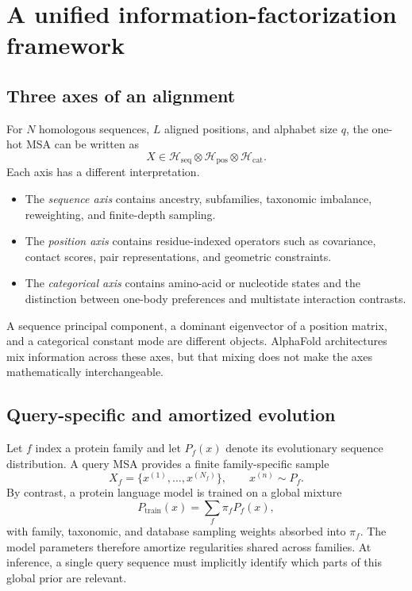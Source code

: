 \documentclass[10pt]{article}
\begin{document}
\section{A unified information-factorization framework}

\subsection{Three axes of an alignment}

For $N$ homologous sequences, $L$ aligned positions, and alphabet size $q$, the one-hot MSA can be
written as
\begin{equation}
X\in
\mathcal H_{\mathrm{seq}}
\otimes
\mathcal H_{\mathrm{pos}}
\otimes
\mathcal H_{\mathrm{cat}}.
\label{eq:msa-product-space}
\end{equation}
Each axis has a different interpretation.
\begin{itemize}
\setlength{\itemsep}{1pt}
\item The \emph{sequence axis} contains ancestry, subfamilies, taxonomic imbalance, reweighting,
and finite-depth sampling.
\item The \emph{position axis} contains residue-indexed operators such as covariance, contact
scores, pair representations, and geometric constraints.
\item The \emph{categorical axis} contains amino-acid or nucleotide states and the distinction
between one-body preferences and multistate interaction contrasts.
\end{itemize}
A sequence principal component, a dominant eigenvector of a position matrix, and a categorical
constant mode are different objects.  AlphaFold architectures mix information across these axes,
but that mixing does not make the axes mathematically interchangeable.

\subsection{Query-specific and amortized evolution}

Let $f$ index a protein family and let $P_f(x)$ denote its evolutionary sequence distribution.
A query MSA provides a finite family-specific sample
\begin{equation}
X_f=\{x^{(1)},\ldots,x^{(N_f)}\},
\qquad x^{(n)}\sim P_f.
\label{eq:family-msa-sample}
\end{equation}
By contrast, a protein language model is trained on a global mixture
\begin{equation}
P_{\mathrm{train}}(x)
=\sum_f\pi_fP_f(x),
\label{eq:global-evolutionary-mixture}
\end{equation}
with family, taxonomic, and database sampling weights absorbed into $\pi_f$.  The model parameters
therefore amortize regularities shared across families.  At inference, a single query sequence must
implicitly identify which parts of this global prior are relevant.
\end{document}
